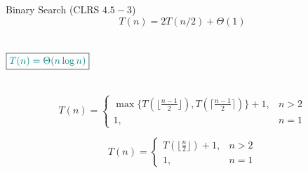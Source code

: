 
\begin{frame}{}
  \begin{exampleblock}{Binary Search (CLRS $4.5-3$)}
    \[
      T(n) = 2T(n/2) + \Theta(1)
    \]
  \end{exampleblock}

  \begin{columns}
      
      \[
	\boxed{\textcolor{teal}{T(n) = \Theta(n \log n)}}
      \]
  \end{columns}
\end{frame}

% 
% 
% 
% 

\begin{frame}{}

  \[
    T(n) = \left\{\begin{array}{lr}
      \max\Big\{T(\lfloor \frac{n-1}{2} \rfloor), T(\lceil \frac{n-1}{2} \rceil)\Big\} + 1, & n > 2 \\
      1, & n = 1
  \end{array}\right.
  \]

  \pause
  \vspace{0.30cm}
  \[
    T(n) = \left\{\begin{array}{lr}
      T(\lfloor \frac{n}{2} \rfloor) + 1, & n > 2 \\
      1, & n = 1
    \end{array}\right.
  \]
\end{frame}

